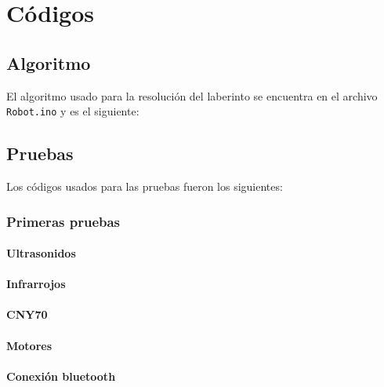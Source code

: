 \chapter{Códigos}

\section{Algoritmo}
El \hypertarget{laberinto}{algoritmo} usado para la resolución del laberinto se encuentra en el archivo \texttt{Robot.ino} y es el siguiente:


\section{Pruebas}
Los códigos usados para las pruebas fueron los siguientes:
\subsection{Primeras pruebas}
\hypertarget{primerasPruebas}{}
\subsubsection{Ultrasonidos}

\subsubsection{Infrarrojos}

\subsubsection{CNY70}

\subsubsection{Motores}

\subsubsection{Conexión bluetooth}


